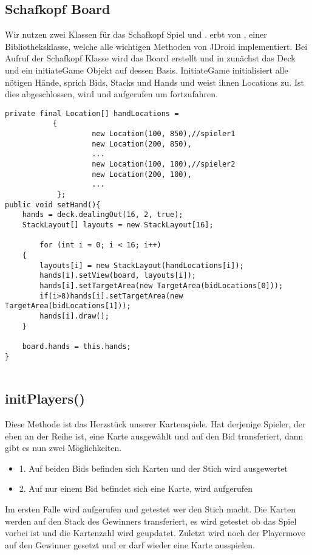 \subsection{Schafkopf Board}
Wir nutzen zwei Klassen für das Schafkopf Spiel  und .
 erbt von , einer Bibliotheksklasse, welche alle wichtigen Methoden von JDroid implementiert. Bei Aufruf der Schafkopf Klasse wird das Board erstellt und in  zunächst das Deck und ein initiateGame Objekt auf dessen Basis. InitiateGame initialisiert alle nötigen Hände, sprich Bids, Stacks und Hands und weist ihnen Locations zu. Ist dies abgeschlossen, wird  und  aufgerufen um fortzufahren.
\begin{lstlisting}[caption={Beispiel Hands initialisieren},captionpos=b]
private final Location[] handLocations =
           {
                    new Location(100, 850),//spieler1
                    new Location(200, 850),
 					...
                    new Location(100, 100),//spieler2
                    new Location(200, 100),
       				...
            };
public void setHand(){
    hands = deck.dealingOut(16, 2, true);
    StackLayout[] layouts = new StackLayout[16];

        for (int i = 0; i < 16; i++)
    {
        layouts[i] = new StackLayout(handLocations[i]);
        hands[i].setView(board, layouts[i]);
        hands[i].setTargetArea(new TargetArea(bidLocations[0]));
        if(i>8)hands[i].setTargetArea(new TargetArea(bidLocations[1]));
        hands[i].draw();
    }

    board.hands = this.hands;
}            
           
\end{lstlisting}

\subsection{initPlayers()}
Diese Methode ist das Herzstück unserer Kartenspiele. Hat derjenige Spieler, der eben an der Reihe ist, eine Karte ausgewählt und auf den Bid transferiert, dann gibt es nun zwei Möglichkeiten.
\begin{itemize}
\item 1. Auf beiden Bids befinden sich Karten und der Stich wird ausgewertet
\item 2. Auf nur einem Bid befindet sich eine Karte,  wird 		 aufgerufen
\end{itemize}
Im ersten Falle wird  aufgerufen und getestet wer den Stich macht.
Die Karten werden auf den Stack des Gewinners transferiert, es wird getestet ob das Spiel vorbei ist und die Kartenzahl wird geupdatet. Zuletzt wird noch der Playermove auf den Gewinner gesetzt und er darf wieder eine Karte ausspielen.

